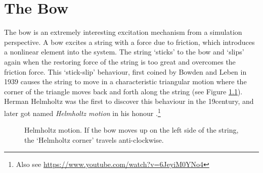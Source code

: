 \chapter{The Bow}\label{ch:bow}
The bow is an extremely interesting excitation mechanism from a simulation perspective.
A bow excites a string with a force due to friction, which introduces a nonlinear element into the system.
The string `sticks' to the bow and `slips' again when the restoring force of the string is too great and overcomes the friction force. This `stick-slip' behaviour, first coined by Bowden and Leben in 1939 \cite{Bowden1939} causes the string to move in a characteristic triangular motion where the corner of the triangle moves back and forth along the string (see Figure \ref{fig:helmholtz}). Herman Helmholtz was the first to discover this behaviour in the 19\th century, and later got named \textit{Helmholtz motion} in his honour \cite{Helmholtz1860}.\footnote{Also see \url{https://www.youtube.com/watch?v=6JeyiM0YNo4}}

\begin{figure}[h]
    \centering
    \caption{Helmholtz motion. If the bow moves up on the left side of the string, the `Helmholtz corner' travels anti-clockwise. \label{fig:helmholtz}}
\end{figure}


